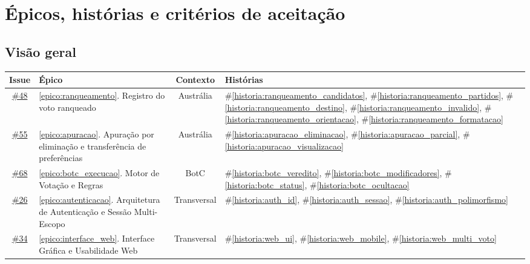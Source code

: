 \documentclass[12pt,a4paper]{article}
\newcounter{epico}
\newcounter{historia}
\begin{document}
\section{\'Epicos, hist\'orias e crit\'erios de aceita\c{c}\~ao}

\subsection{Vis\~ao geral}

\begin{table}[H]
    \centering
    \begin{tabular}{|c|p{7cm}|c|p{4.5cm}|}
    \hline
    \rowcolor[gray]{0.9}
    \textbf{Issue} & \textbf{Épico} & \textbf{Contexto} & \textbf{Histórias} \\
    \hline
    
    \href{https://github.com/GiizAzul/MC656/issues/48}{\#48} & \ref{epico:ranqueamento}. Registro do voto ranqueado & Austrália & \#\ref{historia:ranqueamento_candidatos}, \#\ref{historia:ranqueamento_partidos}, \#\ref{historia:ranqueamento_destino}, \#\ref{historia:ranqueamento_invalido}, \#\ref{historia:ranqueamento_orientacao}, \#\ref{historia:ranqueamento_formatacao} \\
    
    \href{https://github.com/GiizAzul/MC656/issues/55}{\#55} & \ref{epico:apuracao}. Apuração por eliminação e transferência de preferências & Austrália & \#\ref{historia:apuracao_eliminacao}, \#\ref{historia:apuracao_parcial}, \#\ref{historia:apuracao_visualizacao} \\

    \href{https://github.com/GiizAzul/MC656/issues/68}{\#68} & \ref{epico:botc_execucao}. Motor de Votação e Regras & BotC & \#\ref{historia:botc_veredito}, \#\ref{historia:botc_modificadores}, \#\ref{historia:botc_status}, \#\ref{historia:botc_ocultacao} \\
    
    \href{https://github.com/GiizAzul/MC656/issues/26}{\#26} & \ref{epico:autenticacao}. Arquitetura de Autenticação e Sessão Multi-Escopo & Transversal & \#\ref{historia:auth_id}, \#\ref{historia:auth_sessao}, \#\ref{historia:auth_polimorfismo} \\

    \href{https://github.com/GiizAzul/MC656/issues/34}{\#34} & \ref{epico:interface_web}. Interface Gráfica e Usabilidade Web & Transversal & \#\ref{historia:web_ui}, \#\ref{historia:web_mobile}, \#\ref{historia:web_multi_voto}\\
    

\end{tabular}
\end{table}
\end{document}

